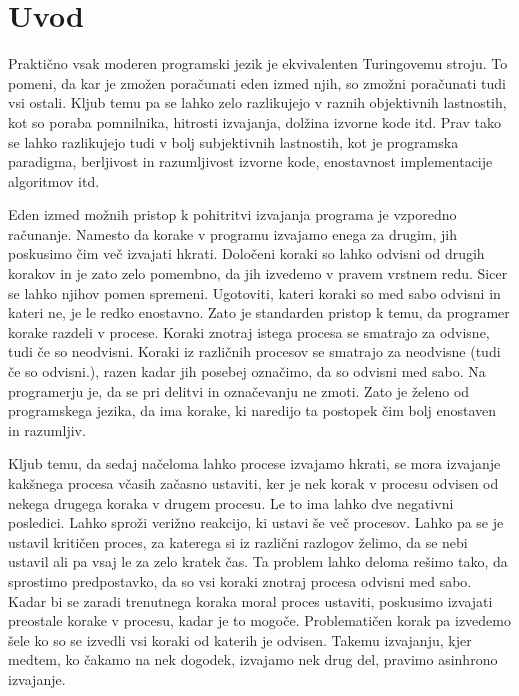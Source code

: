 \section{Uvod} \label{sec:uvod}


Praktično vsak moderen programski jezik je ekvivalenten Turingovemu stroju. To pomeni, da kar je zmožen poračunati eden izmed njih, so zmožni poračunati tudi vsi ostali. Kljub temu pa se lahko zelo razlikujejo v raznih objektivnih lastnostih, kot so poraba pomnilnika, hitrosti izvajanja, dolžina izvorne kode itd. Prav tako se lahko razlikujejo tudi v bolj subjektivnih lastnostih, kot je programska paradigma, berljivost in razumljivost izvorne kode, enostavnost implementacije algoritmov itd.

Eden izmed možnih pristop k pohitritvi izvajanja programa je vzporedno računanje. Namesto da korake v programu izvajamo enega za drugim, jih poskusimo čim več izvajati hkrati. Določeni koraki so lahko odvisni od drugih korakov in je zato zelo pomembno, da jih izvedemo v pravem vrstnem redu. Sicer se lahko njihov pomen spremeni. Ugotoviti, kateri koraki so med sabo odvisni in kateri ne, je le redko enostavno. Zato je standarden pristop k temu, da programer korake razdeli v procese. Koraki znotraj istega procesa se smatrajo za odvisne, tudi če so neodvisni. Koraki iz različnih procesov se smatrajo za neodvisne (tudi če so odvisni.), razen kadar jih posebej označimo, da so odvisni med sabo.
Na programerju je, da se pri delitvi in označevanju ne zmoti. Zato je želeno od programskega jezika, da ima korake, ki naredijo ta postopek čim bolj enostaven in razumljiv.

Kljub temu, da sedaj načeloma lahko procese izvajamo hkrati, se mora izvajanje kakšnega procesa včasih začasno ustaviti, ker je nek korak v procesu odvisen od nekega drugega koraka v drugem procesu. Le to ima lahko dve negativni posledici. Lahko sproži verižno reakcijo, ki ustavi še več procesov. Lahko pa se je ustavil kritičen proces, za katerega si iz različni razlogov želimo, da se nebi ustavil ali pa vsaj le za zelo kratek čas.
Ta problem lahko deloma rešimo tako, da sprostimo predpostavko, da so vsi koraki znotraj procesa odvisni med sabo. Kadar bi se zaradi trenutnega koraka moral proces ustaviti, poskusimo izvajati preostale korake v procesu, kadar je to mogoče. Problematičen korak pa izvedemo šele ko so se izvedli vsi koraki od katerih je odvisen. Takemu izvajanju, kjer medtem, ko čakamo na nek dogodek, izvajamo nek drug del, pravimo asinhrono izvajanje. 


